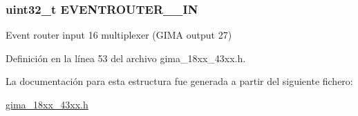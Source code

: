 \subsubsection[{\texorpdfstring{E\+V\+E\+N\+T\+R\+O\+U\+T\+E\+R\+\_\+16\+\_\+\+IN}{EVENTROUTER_16_IN}}]{ uint32\+\_\+t E\+V\+E\+N\+T\+R\+O\+U\+T\+E\+R\+\_\+\_\+\+IN}\hypertarget{struct_l_p_c___g_i_m_a___t_ae0528f872252b965ea76fb4315eea4e8}{}\label{struct_l_p_c___g_i_m_a___t_ae0528f872252b965ea76fb4315eea4e8}
Event router input 16 multiplexer (G\+I\+MA output 27) 

Definición en la línea 53 del archivo gima\+\_\+18xx\+\_\+43xx.\+h.



La documentación para esta estructura fue generada a partir del siguiente fichero\+:\begin{DoxyCompactItemize}
\item 
\hyperlink{gima__18xx__43xx_8h}{gima\+\_\+18xx\+\_\+43xx.\+h}\end{DoxyCompactItemize}

